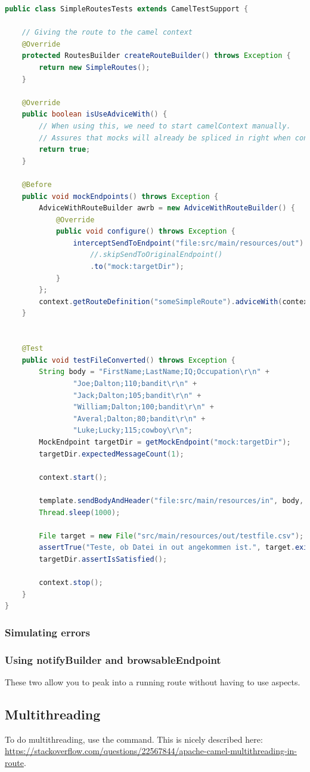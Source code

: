 \begin{lstlisting}[language=java]
public class SimpleRoutesTests extends CamelTestSupport {
	
	// Giving the route to the camel context
	@Override
	protected RoutesBuilder createRouteBuilder() throws Exception {
		return new SimpleRoutes();
	}
	
	@Override
	public boolean isUseAdviceWith() {
		// When using this, we need to start camelContext manually.
		// Assures that mocks will already be spliced in right when context starts.
		return true; 
	}
	
	@Before
	public void mockEndpoints() throws Exception {
		AdviceWithRouteBuilder awrb = new AdviceWithRouteBuilder() {
			@Override
			public void configure() throws Exception {
				interceptSendToEndpoint("file:src/main/resources/out")
					//.skipSendToOriginalEndpoint()
					.to("mock:targetDir");
			}
		};
		context.getRouteDefinition("someSimpleRoute").adviceWith(context, awrb);
	}
	
	
	@Test
	public void testFileConverted() throws Exception {
		String body = "FirstName;LastName;IQ;Occupation\r\n" + 
				"Joe;Dalton;110;bandit\r\n" + 
				"Jack;Dalton;105;bandit\r\n" + 
				"William;Dalton;100;bandit\r\n" + 
				"Averal;Dalton;80;bandit\r\n" + 
				"Luke;Lucky;115;cowboy\r\n";
		MockEndpoint targetDir = getMockEndpoint("mock:targetDir");
		targetDir.expectedMessageCount(1);
		
		context.start();
		
		template.sendBodyAndHeader("file:src/main/resources/in", body, Exchange.FILE_NAME, "testfile.csv");
		Thread.sleep(1000);
		
		File target = new File("src/main/resources/out/testfile.csv");
		assertTrue("Teste, ob Datei in out angekommen ist.", target.exists());
		targetDir.assertIsSatisfied();
		
		context.stop();
	}
}
\end{lstlisting}

\subsubsection{Simulating errors}

\subsubsection{Using notifyBuilder and browsableEndpoint}
These two allow you to peak into a running route without having to use aspects.

\subsection{Multithreading}
To do multithreading, use the  command. This is nicely described here: \href{https://stackoverflow.com/questions/22567844/apache-camel-multithreading-in-route}{https://stackoverflow.com/questions/22567844/apache-camel-multithreading-in-route}.
